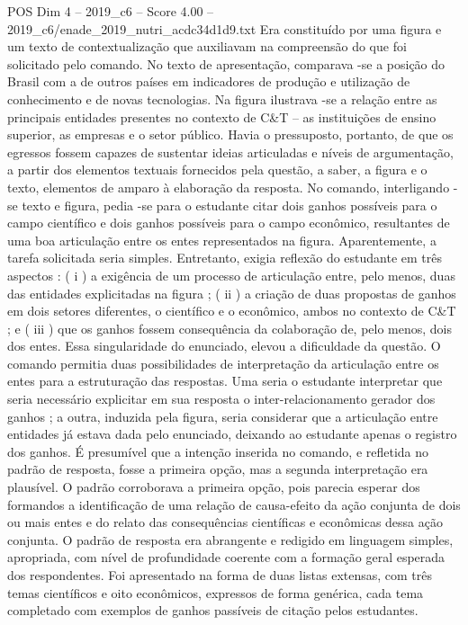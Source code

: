 \begin{textsample}{POS Dim 4 – 2019\_c6 – Score 4.00 – 2019\_c6/enade\_2019\_nutri\_acdc34d1d9.txt}
Era constituído por uma figura e um texto de contextualização que auxiliavam na compreensão do que foi solicitado pelo comando.
No texto de apresentação, comparava -se a posição do Brasil com a de outros países em indicadores de produção e utilização de conhecimento e de novas tecnologias.
Na figura ilustrava -se a relação entre as principais entidades presentes no contexto de C\&T – as instituições de ensino superior, as empresas e o setor público.
Havia o pressuposto, portanto, de que os egressos fossem capazes de sustentar ideias articuladas e níveis de argumentação, a partir dos elementos textuais fornecidos pela questão, a saber, a figura e o texto, elementos de amparo à elaboração da resposta.
No comando, interligando -se texto e figura, pedia -se para o estudante citar dois ganhos possíveis para o campo científico e dois ganhos possíveis para o campo econômico, resultantes de uma boa articulação entre os entes representados na figura.
Aparentemente, a tarefa solicitada seria simples.
Entretanto, exigia reflexão do estudante em três aspectos : ( i ) a exigência de um processo de articulação entre, pelo menos, duas das entidades explicitadas na figura ; ( ii ) a criação de duas propostas de ganhos em dois setores diferentes, o científico e o econômico, ambos no contexto de C\&T ; e ( iii ) que os ganhos fossem consequência da colaboração de, pelo menos, dois dos entes.
Essa singularidade do enunciado, elevou a dificuldade da questão.
O comando permitia duas possibilidades de interpretação da articulação entre os entes para a estruturação das respostas.
Uma seria o estudante interpretar que seria necessário explicitar em sua resposta o inter-relacionamento gerador dos ganhos ; a outra, induzida pela figura, seria considerar que a articulação entre entidades já estava dada pelo enunciado, deixando ao estudante apenas o registro dos ganhos.
É presumível que a intenção inserida no comando, e refletida no padrão de resposta, fosse a primeira opção, mas a segunda interpretação era plausível.
O padrão corroborava a primeira opção, pois parecia esperar dos formandos a identificação de uma relação de causa-efeito da ação conjunta de dois ou mais entes e do relato das consequências científicas e econômicas dessa ação conjunta.
O padrão de resposta era abrangente e redigido em linguagem simples, apropriada, com nível de profundidade coerente com a formação geral esperada dos respondentes.
Foi apresentado na forma de duas listas extensas, com três temas científicos e oito econômicos, expressos de forma genérica, cada tema completado com exemplos de ganhos passíveis de citação pelos estudantes.

\end{textsample}
